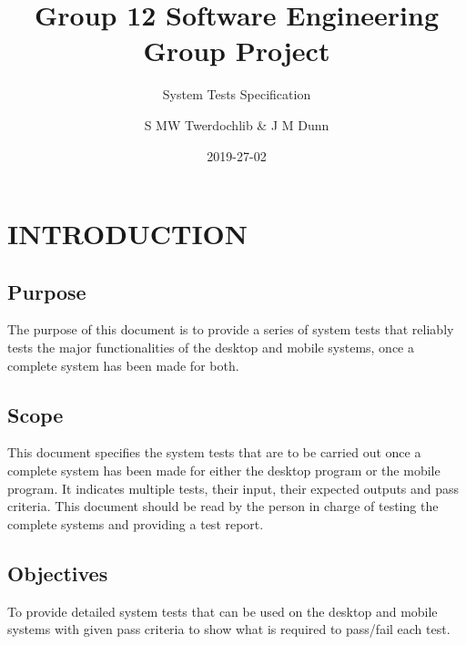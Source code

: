 \documentclass{project}
\begin{document}
 \title{Group 12 Software Engineering Group Project}
 \subtitle{System Tests Specification}
 \author{S MW Twerdochlib \& J M Dunn}     
 \date{2019-27-02}
 \maketitle

 \tableofcontents

 \newpage

 \section{INTRODUCTION}
 \subsection {Purpose}
The purpose of this document is to provide a series of system tests that reliably tests the major functionalities of the desktop and mobile systems, once a complete system has been made for both. 

 \subsection {Scope}
This document specifies the system tests that are to be carried out once a complete system has been made for either the desktop program or the mobile program. It indicates multiple tests, their input, their expected outputs and pass criteria.
This document should be read by the person in charge of testing the complete systems and providing a test report.

 \subsection {Objectives}
To provide detailed system tests that can be used on the desktop and mobile systems with given pass criteria to show what is required to pass/fail each test.
\end{document}

